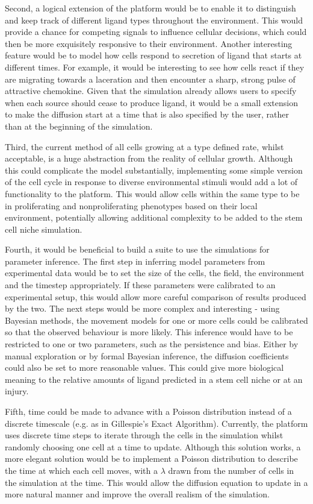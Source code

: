 \documentclass[12pt]{article}
\begin{document}
Second, a logical extension of the platform would be to enable it to 
distinguish and keep track of different ligand types throughout the 
environment. This would provide a chance for competing signals to 
influence cellular decisions, which could then be more exquisitely 
responsive to their environment. Another interesting feature would be to 
model how cells respond to secretion of ligand that starts at different 
times. For example, it would be interesting to see how cells react
if they are migrating towards a laceration and then encounter a 
sharp, strong pulse of attractive chemokine. Given that 
the simulation already allows users to specify when each source should 
cease to produce ligand, it would be a small extension to make the 
diffusion start at a time that is also specified by the user, rather 
than at the beginning of the simulation. 

Third, the current method of all cells growing at a type defined rate, 
whilst acceptable, is a huge abstraction from the reality of cellular 
growth. Although this could complicate the model substantially, 
implementing some simple version of the cell cycle in response to 
diverse environmental stimuli would add a lot of functionality to the 
platform. This would allow cells within the same type to be in 
proliferating and nonproliferating phenotypes based on their local 
environment, potentially allowing additional complexity to be added to 
the stem cell niche simulation.

Fourth, it would be beneficial to build a suite to use the simulations 
for parameter inference. The first step in inferring model parameters 
from experimental data would be to set the size of the cells, the field, 
the environment and the timestep appropriately. If these parameters were 
calibrated to an experimental setup, this would allow more careful 
comparison of results produced by the two. The next steps would be more 
complex and interesting - using Bayesian methods, the movement models 
for one or more cells could be calibrated so that the observed behaviour 
is more likely. This inference would have to be restricted to one or two 
parameters, such as the persistence and bias. Either by manual 
exploration or by formal Bayesian inference, the diffusion coefficients 
could also be set to more reasonable values. This could give more 
biological meaning to the relative amounts of ligand predicted in a stem 
cell niche or at an injury.

Fifth, time could be made to advance with a Poisson distribution instead 
of a discrete timescale (e.g. as in Gillespie's Exact Algorithm). 
Currently, the platform uses discrete time steps to iterate through the 
cells in the simulation whilst randomly choosing one cell at a time to 
update. Although this solution works, a more elegant solution would be 
to implement a Poisson distribution to describe the time at which each 
cell moves, with a \(\lambda\) drawn from the number of cells in the simulation at 
the time. This would allow the diffusion equation to update in a more 
natural manner and improve the overall realism of the simulation.
\end{document}
